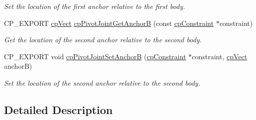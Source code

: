 \begin{DoxyCompactItemize}
\begin{DoxyCompactList}\small\item\em Set the location of the first anchor relative to the first body. \end{DoxyCompactList}\item 
\mbox{\label{group__cp_pivot_joint_ga943cf22aaf64d81b0997649edbacdeb8}} 
C\+P\+\_\+\+E\+X\+P\+O\+RT \mbox{\hyperlink{structcp_vect}{cp\+Vect}} \mbox{\hyperlink{group__cp_pivot_joint_ga943cf22aaf64d81b0997649edbacdeb8}{cp\+Pivot\+Joint\+Get\+AnchorB}} (const \mbox{\hyperlink{structcp_constraint}{cp\+Constraint}} $\ast$constraint)
\begin{DoxyCompactList}\small\item\em Get the location of the second anchor relative to the second body. \end{DoxyCompactList}\item 
\mbox{\label{group__cp_pivot_joint_ga433e38d1b11055495205880e93a499cc}} 
C\+P\+\_\+\+E\+X\+P\+O\+RT void \mbox{\hyperlink{group__cp_pivot_joint_ga433e38d1b11055495205880e93a499cc}{cp\+Pivot\+Joint\+Set\+AnchorB}} (\mbox{\hyperlink{structcp_constraint}{cp\+Constraint}} $\ast$constraint, \mbox{\hyperlink{structcp_vect}{cp\+Vect}} anchorB)
\begin{DoxyCompactList}\small\item\em Set the location of the second anchor relative to the second body. \end{DoxyCompactList}\end{DoxyCompactItemize}


\subsection{Detailed Description}
